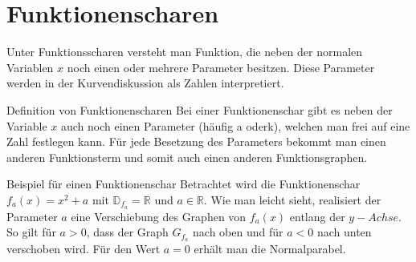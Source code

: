 \section{Funktionenscharen}
Unter Funktionsscharen versteht man Funktion, die neben der \glqq normalen\grqq{} Variablen $x$ noch einen oder mehrere Parameter besitzen. Diese Parameter werden in der Kurvendiskussion als Zahlen interpretiert. 
\begin{defi}{Definition von Funktionenscharen}{}
Bei einer Funktionenschar gibt es neben der Variable $x$ auch noch einen Parameter (häufig a oderk), welchen man frei auf eine Zahl festlegen kann. Für jede Besetzung des Parameters bekommt man einen anderen Funktionsterm und somit auch einen anderen Funktionsgraphen.
\end{defi}
\begin{bsp}{Beispiel für einen Funktionenschar}{}
Betrachtet wird die Funktionenschar $f_a(x) = x^2 +a$ mit $\mathds{D}_{f_a} = \mathds{R}$ und $a \in \mathds{R}$. Wie man leicht sieht, realisiert der Parameter $a$ eine Verschiebung des Graphen von $f_a(x)$ entlang der $y-Achse$. So gilt für $a>0$, dass der Graph $G_{f_a}$ nach oben und für $a<0$ nach unten verschoben wird. Für den Wert $a= 0$ erhält man die Normalparabel.
\begin{center}
\end{center}
\end{bsp}
